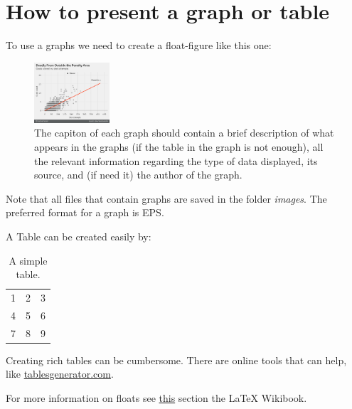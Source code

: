 \documentclass[11pt,a4paper,oneside]{book}
\newcommand{\latex}{\LaTeX\xspace} %
\begin{document}
\section{How to present a graph or table}
\label{sec:floats}
To use a graphs we need to create a float-figure like this one:
\begin{figure}[h!]
  \centering
    \includegraphics[width=0.25\textwidth]{example}
    \caption{The capiton of each graph should contain a brief description of what appears in the graphs (if the table in the graph is not enough), all the relevant information regarding the type of data displayed, its source, and (if need it) the author of the graph.}
    \label{fig:messi_vs_ronaldo}
\end{figure}

Note that all files that contain graphs are saved in the folder \textit{images}. The preferred format for a graph is EPS.

A Table can be created easily by:
\begin{table}[h!]
  \centering
    \begin{tabular}{| l c r |}
    \hline
    1 & 2 & 3 \\
    4 & 5 & 6 \\
    7 & 8 & 9 \\
    \hline
    \end{tabular}
  \caption{A simple table.}
  \label{tab:simple_table}
\end{table}

Creating rich tables can be cumbersome. There are online tools that can help, like \href{https://www.tablesgenerator.com/}{tablesgenerator.com}.

For more information on floats see \href{https://en.wikibooks.org/wiki/LaTeX/Floats,_Figures_and_Captions}{this} section the \latex Wikibook.

\end{document}
